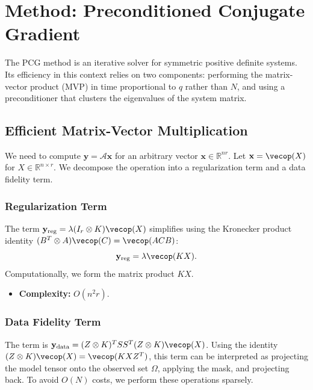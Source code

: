 \documentclass[11pt]{article}
\begin{document}
\section{Method: Preconditioned Conjugate Gradient}

The PCG method is an iterative solver for symmetric positive definite systems. Its efficiency in this context relies on two components: performing the matrix-vector product (MVP) in time proportional to $q$ rather than $N$, and using a preconditioner that clusters the eigenvalues of the system matrix.

\subsection{Efficient Matrix-Vector Multiplication}
\label{sec:mvp}

We need to compute $\mathbf{y} = \mathcal{A} \mathbf{x}$ for an arbitrary vector $\mathbf{x} \in \mathbb{R}^{nr}$. Let $\mathbf{x} = \vecop(X)$ for $X \in \mathbb{R}^{n \times r}$. We decompose the operation into a regularization term and a data fidelity term.

\subsubsection{Regularization Term}
The term $\mathbf{y}_{\text{reg}} = \lambda (I_r \otimes K) \vecop(X)$ simplifies using the Kronecker product identity $(B^T \otimes A) \vecop(C) = \vecop(ACB)$:
\begin{equation}
    \mathbf{y}_{\text{reg}} = \lambda \vecop(K X).
\end{equation}
Computationally, we form the matrix product $KX$.
\begin{itemize}
    \item \textbf{Complexity:} $O(n^2 r)$.
\end{itemize}

\subsubsection{Data Fidelity Term}
The term is $\mathbf{y}_{\text{data}} = (Z \otimes K)^T S S^T (Z \otimes K) \vecop(X)$. Using the identity $(Z \otimes K) \vecop(X) = \vecop(K X Z^T)$, this term can be interpreted as projecting the model tensor onto the observed set $\Omega$, applying the mask, and projecting back. To avoid $O(N)$ costs, we perform these operations sparsely.
\end{document}
